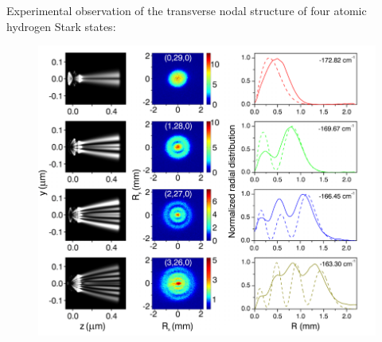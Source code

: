 Experimental observation of the transverse nodal structure of four atomic hydrogen Stark states:
\begin{minipage}{0.55\textwidth}
    \begin{figure}[h]
        \centering
        \includegraphics[width=1.1\textwidth]{figures/3.png}
    \end{figure}
\end{minipage}
\hfill
\begin{minipage}{0.4\textwidth}
\end{minipage}



